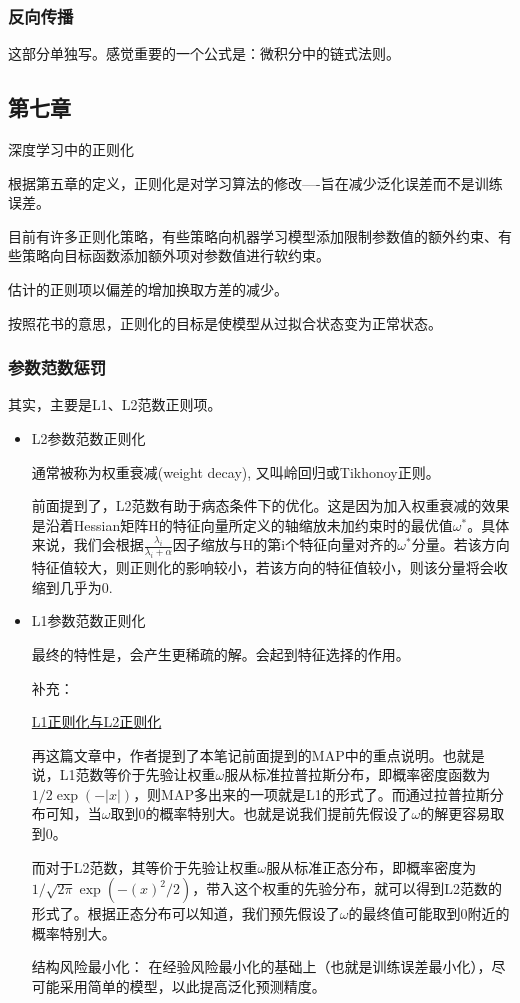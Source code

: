 \subsubsection{反向传播}

这部分单独写。感觉重要的一个公式是：微积分中的链式法则。

\subsection{第七章}

深度学习中的正则化

根据第五章的定义，正则化是对学习算法的修改----旨在减少泛化误差而不是训练误差。

目前有许多正则化策略，有些策略向机器学习模型添加限制参数值的额外约束、有些策略向目标函数添加额外项对参数值进行软约束。

估计的正则项以偏差的增加换取方差的减少。

按照花书的意思，正则化的目标是使模型从过拟合状态变为正常状态。

\subsubsection{参数范数惩罚}

其实，主要是L1、L2范数正则项。

\begin{itemize}
\item L2参数范数正则化

通常被称为权重衰减(weight decay), 又叫岭回归或Tikhonoy正则。

前面提到了，L2范数有助于病态条件下的优化。这是因为加入权重衰减的效果是沿着Hessian矩阵H的特征向量所定义的轴缩放未加约束时的最优值$\omega^{*}$。具体来说，我们会根据$\frac{\lambda_i}{\lambda_i+\alpha}$因子缩放与H的第i个特征向量对齐的$\omega^{*}$分量。若该方向特征值较大，则正则化的影响较小，若该方向的特征值较小，则该分量将会收缩到几乎为0.

\item L1参数范数正则化

最终的特性是，会产生更稀疏的解。会起到特征选择的作用。

补充：

\href{https://zhuanlan.zhihu.com/p/35356992}{L1正则化与L2正则化}

再这篇文章中，作者提到了本笔记前面提到的MAP中的重点说明。也就是说，L1范数等价于先验让权重$\omega$服从标准拉普拉斯分布，即概率密度函数为$1/2 \exp(-|x|)$，则MAP多出来的一项就是L1的形式了。而通过拉普拉斯分布可知，当$\omega$取到0的概率特别大。也就是说我们提前先假设了$\omega$的解更容易取到0。

而对于L2范数，其等价于先验让权重$\omega$服从标准正态分布，即概率密度为$1/\sqrt{2\pi} \exp(-(x)^2/2)$，带入这个权重的先验分布，就可以得到L2范数的形式了。根据正态分布可以知道，我们预先假设了$\omega$的最终值可能取到0附近的概率特别大。

结构风险最小化： 在经验风险最小化的基础上（也就是训练误差最小化），尽可能采用简单的模型，以此提高泛化预测精度。

\end{itemize}

